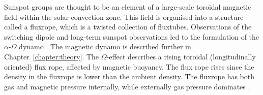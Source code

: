 

Sunspot groups are thought to be an element of a large-scale toroidal magnetic field within the solar convection zone. This field is organised into a structure called a \gls{fluxrope}, which is a twisted collection of \glspl{fluxtube}. Observations of the switching dipole and long-term sunspot observations led to the formulation of the $\alpha$-$\Omega$ dynamo \citep{Parker:1957}. The magnetic dynamo is described further in Chapter~\ref{chapter:theory}. The $\Omega$-effect describes a rising toroidal (longitudinally oriented) flux rope, affected by magnetic buoyancy. The flux rope rises since the density in the \gls{fluxrope} is lower than the ambient density. The \gls{fluxrope} has both gas and magnetic pressure internally, while externally gas pressure dominates \citep{Parker:1955b}.

